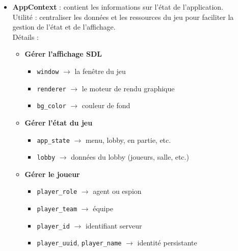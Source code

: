 \documentclass[12pt,a4paper]{article}
\begin{document}
        \begin{itemize}
            \item \textbf{AppContext} : contient les informations sur l’état de l’application.\\
                Utilité : centraliser les données et les ressources du jeu pour faciliter la gestion de l’état et de l’affichage.\\
                Détails :
                \begin{itemize}
                    \item \textbf{Gérer l’affichage SDL}
                    \begin{itemize}
                        \item \texttt{window} $\rightarrow$ la fenêtre du jeu
                        \item \texttt{renderer} $\rightarrow$ le moteur de rendu graphique
                        \item \texttt{bg\_color} $\rightarrow$ couleur de fond
                    \end{itemize}

                    \item \textbf{Gérer l’état du jeu}
                    \begin{itemize}
                        \item \texttt{app\_state} $\rightarrow$ menu, lobby, en partie, etc.
                        \item \texttt{lobby} $\rightarrow$ données du lobby (joueurs, salle, etc.)
                    \end{itemize}

                    \item \textbf{Gérer le joueur}
                    \begin{itemize}
                        \item \texttt{player\_role} $\rightarrow$ agent ou espion
                        \item \texttt{player\_team} $\rightarrow$ équipe
                        \item \texttt{player\_id} $\rightarrow$ identifiant serveur
                        \item \texttt{player\_uuid}, \texttt{player\_name} $\rightarrow$ identité persistante
                    \end{itemize}


\end{itemize}
\end{itemize}
\end{document}
